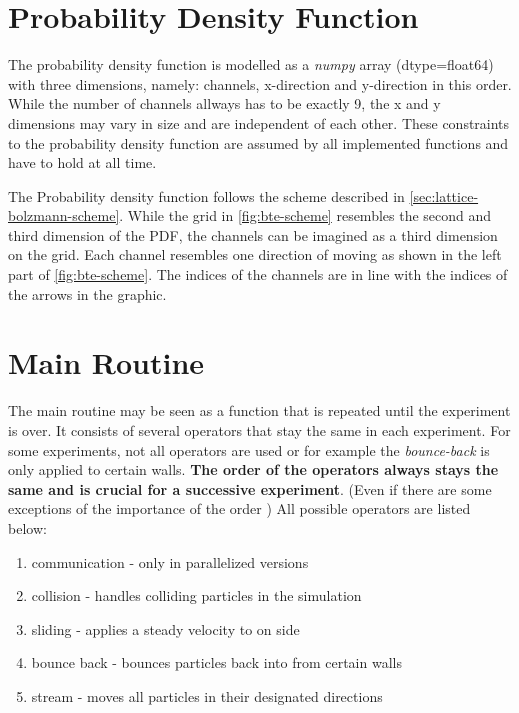 \section{Probability Density Function}
The probability density function is modelled as a \textit{numpy} array (dtype=float64) with three dimensions, namely: channels, x-direction and y-direction in this order.
While the number of channels allways has to be exactly 9, the x and y dimensions may vary in size and are independent of each other.
These constraints to the probability density function are assumed by all implemented functions and have to hold at all time.
\newline

The Probability density function follows the scheme described in \cref{sec:lattice-bolzmann-scheme}.
While the grid in \cref{fig:bte-scheme} resembles the second and third dimension of the PDF, the channels can be imagined as a third dimension on the grid.
Each channel resembles one direction of moving as shown in the left part of \cref{fig:bte-scheme}.
The indices of the channels are in line with the indices of the arrows in the graphic.


\section{Main Routine}\label{sec:main-routine}
The main routine may be seen as a function that is repeated until the experiment is over.
It consists of several operators that stay the same in each experiment.
For some experiments, not all operators are used or for example the \textit{bounce-back} is only applied to certain walls.
\textbf{The order of the operators always stays the same and is crucial for a successive experiment}.
(Even if there are some exceptions of the importance of the order \cite{lecture, 10.1093/oso/9780199592357.001.0001, timm2016lattice})
All possible operators are listed below:
\begin{enumerate}
    \item communication - only in parallelized versions
    \item collision - handles colliding particles in the simulation
    \item sliding - applies a steady velocity to on side
    \item bounce back - bounces particles back into from certain walls
    \item stream - moves all particles in their designated directions
\end{enumerate}

